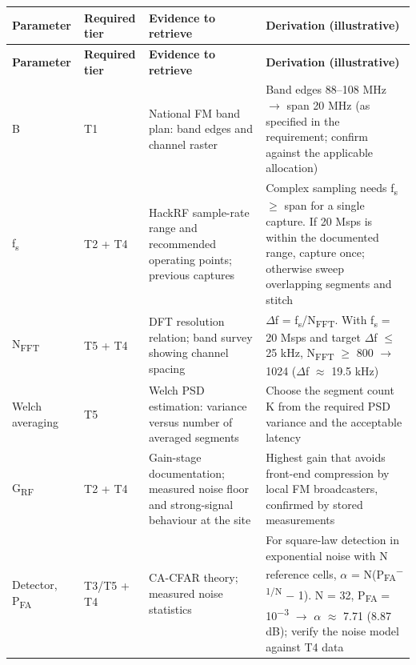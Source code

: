 \documentclass[11pt,a4paper]{article}
\begin{document}
{\small
\begin{longtable}{>{\raggedright\arraybackslash}p{}>{\raggedright\arraybackslash}p{}>{\raggedright\arraybackslash}p{}>{\raggedright\arraybackslash}p{}}
\toprule
\rowcolor{headbg} \textbf{Parameter} & \textbf{Required tier} & \textbf{Evidence to retrieve} & \textbf{Derivation (illustrative)} \\
\midrule
\endfirsthead
\toprule
\rowcolor{headbg} \textbf{Parameter} & \textbf{Required tier} & \textbf{Evidence to retrieve} & \textbf{Derivation (illustrative)} \\
\midrule
\endhead
\bottomrule
\endlastfoot
B & T1 & National FM band plan: band edges and channel raster & Band edges 88--108 MHz \ensuremath{\rightarrow} span 20 MHz (as specified in the requirement; confirm against the applicable allocation) \\ \arrayrulecolor{rulec}\hline\arrayrulecolor{black}
f\textsubscript{s} & T2 + T4 & HackRF sample-rate range and recommended operating points; previous captures & Complex sampling needs f\textsubscript{s} \ensuremath{\geq} span for a single capture. If 20 Msps is within the documented range, capture once; otherwise sweep overlapping segments and stitch \\ \arrayrulecolor{rulec}\hline\arrayrulecolor{black}
N\textsubscript{FFT} & T5 + T4 & DFT resolution relation; band survey showing channel spacing & \ensuremath{\Delta}f = f\textsubscript{s}/N\textsubscript{FFT}. With f\textsubscript{s} = 20 Msps and target \ensuremath{\Delta}f \ensuremath{\leq} 25 kHz, N\textsubscript{FFT} \ensuremath{\geq} 800 \ensuremath{\rightarrow} 1024 (\ensuremath{\Delta}f \ensuremath{\approx} 19.5 kHz) \\ \arrayrulecolor{rulec}\hline\arrayrulecolor{black}
Welch averaging & T5 & Welch PSD estimation: variance versus number of averaged segments & Choose the segment count K from the required PSD variance and the acceptable latency \\ \arrayrulecolor{rulec}\hline\arrayrulecolor{black}
G\textsubscript{RF} & T2 + T4 & Gain-stage documentation; measured noise floor and strong-signal behaviour at the site & Highest gain that avoids front-end compression by local FM broadcasters, confirmed by stored measurements \\ \arrayrulecolor{rulec}\hline\arrayrulecolor{black}
Detector, P\textsubscript{FA} & T3/T5 + T4 & CA-CFAR theory; measured noise statistics & For square-law detection in exponential noise with N reference cells, \ensuremath{\alpha} = N(P\textsubscript{FA}\textsuperscript{\ensuremath{-}1/N} \ensuremath{-} 1). N = 32, P\textsubscript{FA} = 10\textsuperscript{\ensuremath{-}3} \ensuremath{\rightarrow} \ensuremath{\alpha} \ensuremath{\approx} 7.71 (8.87 dB); verify the noise model against T4 data \\
\end{longtable}
}
\end{document}
